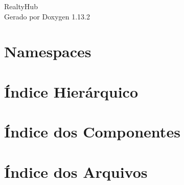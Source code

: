 \documentclass[twoside]{book}
\newcommand{\+}{\discretionary{\mbox{\scriptsize$\hookleftarrow$}}{}{}}
\newcommand{\clearemptydoublepage}{%
    \newpage{\pagestyle{empty}\cleardoublepage}%
  }
\begin{document}
  \raggedbottom
    \hypersetup{pageanchor=false,
                bookmarksnumbered=true,
                pdfencoding=unicode
               }
  \begin{titlepage}
  \vspace*{7cm}
  \begin{center}%
  {\Large Realty\+Hub}\\
  \vspace*{1cm}
  {\large Gerado por Doxygen 1.13.2}\\
  \end{center}
  \end{titlepage}
  \clearemptydoublepage
  \tableofcontents
  \clearemptydoublepage
  \hypersetup{pageanchor=true}
\chapter{Namespaces}

\chapter{Índice Hierárquico}

\chapter{Índice dos Componentes}

\chapter{Índice dos Arquivos}

\end{document}
